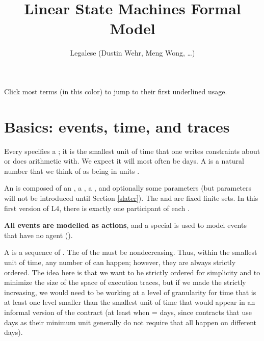 \documentclass[12pt]{article}
\author{Legalese (Dustin Wehr, Meng Wong, \ldots)}
\title{Linear State Machines Formal Model}
\begin{document}
\maketitle



\noindent Click most terms (in \color{TermColor}this color\color{black}) to jump to their first underlined usage.

\tableofcontents



\section{Basics: events, time, and traces} \label{basics}


Every  specifies a ; it is the smallest unit of time that one writes constraints about or does arithmetic with. We expect it will most often be days. A  is a natural number that we think of as being in units \TimeUnit.

An  is composed of an , a , a \TimeStamp, and optionally some parameters (but parameters will not be introduced until Section \ref{slater}). The \Actions and \Roles are fixed finite sets. In this first version of L4, there is exactly one participant of each \Role.

{\bf All events are modelled as actions}, and a special \Role {}  is used to model events that have no agent (\Role).

A  is a sequence of \Events. The \TimeStamps of the \Events must be nondecreasing. Thus, within the smallest unit of time, any number of \Events can happen; however, they are always strictly ordered. The idea here is that we want \Events to be strictly ordered for simplicity and to minimize the size of the space of execution traces, but if we made the \TimeStamps strictly increasing, we would need to be working at a level of granularity for time that is at least one level smaller than the smallest unit of time that would appear in an informal version of the contract (at least when \TimeUnit = days, since contracts that use days as their minimum unit generally do not require that all \Events happen on different days).
\end{document}
